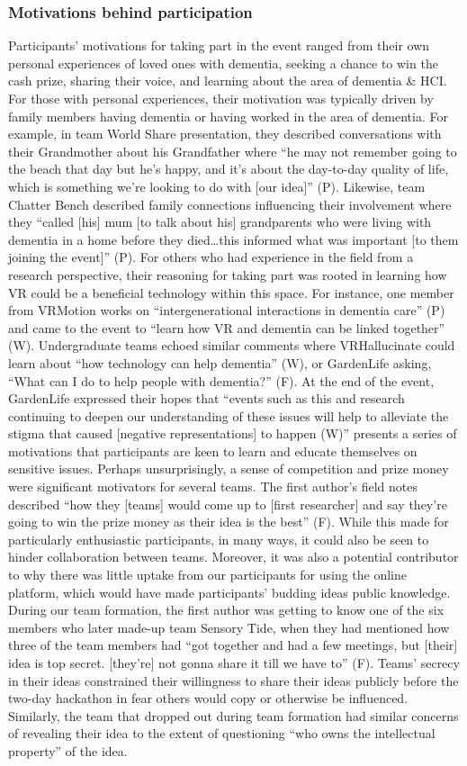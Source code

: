 \subsubsection{Motivations behind participation}
\label{ThemeOne:subthemeOne}
Participants’ motivations for taking part in the event ranged from their own personal experiences of loved ones with dementia, seeking a chance to win the cash prize, sharing their voice, and learning about the area of dementia \& HCI. For those with personal experiences, their motivation was typically driven by family members having dementia or having worked in the area of dementia. For example, in team World Share presentation, they described conversations with their Grandmother about his Grandfather where “he may not remember going to the beach that day but he’s happy, and it’s about the day-to-day quality of life, which is something we’re looking to do with [our idea]” (P). Likewise, team Chatter Bench described family connections influencing their involvement where they “called [his] mum [to talk about his] grandparents who were living with dementia in a home before they died…this informed what was important [to them joining the event]” (P). For others who had experience in the field from a research perspective, their reasoning for taking part was rooted in learning how VR could be a beneficial technology within this space. For instance, one member from VRMotion works on “intergenerational interactions in dementia care” (P) and came to the event to “learn how VR and dementia can be linked together” (W). Undergraduate teams echoed similar comments where VRHallucinate could learn about “how technology can help dementia” (W), or GardenLife asking, “What can I do to help people with dementia?” (F). At the end of the event, GardenLife expressed their hopes that “events such as this and research continuing to deepen our understanding of these issues will help to alleviate the stigma that caused [negative representations] to happen (W)” presents a series of motivations that participants are keen to learn and educate themselves on sensitive issues. Perhaps unsurprisingly, a sense of competition and prize money were significant motivators for several teams. The first author’s field notes described “how they [teams] would come up to [first researcher] and say they’re going to win the prize money as their idea is the best” (F). While this made for particularly enthusiastic participants, in many ways, it could also be seen to hinder collaboration between teams. Moreover, it was also a potential contributor to why there was little uptake from our participants for using the online platform, which would have made participants’ budding ideas public knowledge. During our team formation, the first author was getting to know one of the six members who later made-up team Sensory Tide, when they had mentioned how three of the team members had “got together and had a few meetings, but [their] idea is top secret. [they’re] not gonna share it till we have to” (F). Teams’ secrecy in their ideas constrained their willingness to share their ideas publicly before the two-day hackathon in fear others would copy or otherwise be influenced. Similarly, the team that dropped out during team formation had similar concerns of revealing their idea to the extent of questioning “who owns the intellectual property” of the idea. 
